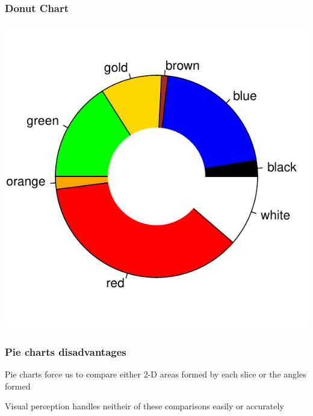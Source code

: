 \documentclass[12pt]{beamer}\usepackage[]{graphicx}\usepackage[]{color}
\newenvironment{knitrout}{}{} %
\begin{document}

\begin{frame}[fragile]
\frametitle{Donut Chart}

\begin{knitrout}\footnotesize
{}\color{fgcolor}

{\centering \includegraphics[width=.6\linewidth,height=.6\linewidth]{figure/unnamed-chunk-15-1} 

}



\end{knitrout}

\end{frame}


\begin{frame}
\frametitle{Pie charts disadvantages}
\bbi
  \item Pie charts force us to compare either 2-D areas formed by each slice or the angles formed
  \item Visual perception handles neitheir of these comparisons easily or accurately
\ei
\end{frame}


\begin{frame}
\begin{center}
\Huge{}
\end{center}
\end{frame}

\end{document}
